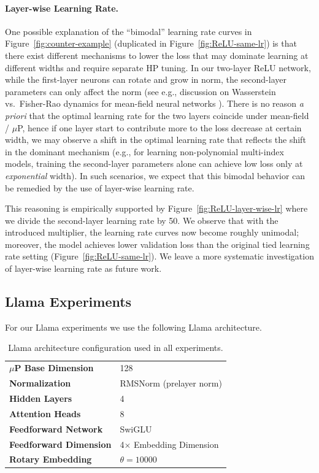 \documentclass{article} %
\renewcommand{\citep}[1]{\cite{#1}}
\begin{document}
\paragraph{Layer-wise Learning Rate.}
One possible explanation of the ``bimodal'' learning rate curves in Figure~\ref{fig:counter-example} (duplicated in Figure~\ref{fig:ReLU-same-lr}) is that there exist different mechanisms to lower the loss that may dominate learning at different widths and require separate HP tuning. In our two-layer ReLU network, while the first-layer neurons can rotate and grow in norm, the second-layer parameters can only affect the norm (see e.g., discussion on Wasserstein vs.~Fisher-Rao dynamics for mean-field neural networks \citep{chizat2022sparse}). There is no reason \textit{a priori} that the optimal learning rate for the two layers coincide under mean-field / $\mu$P, hence if one layer start to contribute more to the loss decrease at certain width, we may observe a shift in the optimal learning rate that reflects the shift in the dominant mechanism (e.g., for learning non-polynomial multi-index models, training the second-layer parameters alone can achieve low loss only at \textit{exponential} width). In such scenarios, we expect that this bimodal behavior can be remedied by the use of layer-wise learning rate.  

This reasoning is empirically supported by Figure~\ref{fig:ReLU-layer-wise-lr} where we divide the second-layer learning rate by 50. We observe that with the introduced multiplier, the learning rate curves now become roughly unimodal; moreover, the model achieves lower validation loss than the original tied learning rate setting (Figure~\ref{fig:ReLU-same-lr}). 
We leave a more systematic investigation of layer-wise learning rate as future work. 

\newpage
\subsection{Llama Experiments}\label{app:llama_exps}
For our Llama experiments we use the following Llama architecture.

\begin{table}[ht]
\centering
\small
\renewcommand{\arraystretch}{1.2}
\begin{tabular}{@{}ll@{}}
\toprule
\textbf{$\mu$P Base Dimension} & 128 \\
\addlinespace
\textbf{Normalization} & RMSNorm (prelayer norm) \\
\addlinespace
\textbf{Hidden Layers} & 4 \\
\addlinespace
\textbf{Attention Heads} & 8 \\
\addlinespace
\textbf{Feedforward Network} & SwiGLU\\
\addlinespace
\textbf{Feedforward Dimension} & 4$\times$ Embedding Dimension\\
\addlinespace
\textbf{Rotary Embedding} & $\theta = 10000$ \\
\bottomrule
\end{tabular}
\caption{Llama architecture configuration used in all experiments.}
\end{table}
\end{document}
